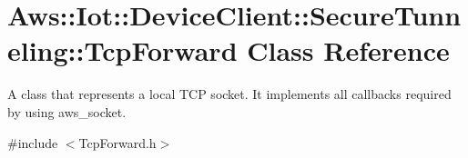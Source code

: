 \hypertarget{class_aws_1_1_iot_1_1_device_client_1_1_secure_tunneling_1_1_tcp_forward}{}\section{Aws\+:\+:Iot\+:\+:Device\+Client\+:\+:Secure\+Tunneling\+:\+:Tcp\+Forward Class Reference}
\label{class_aws_1_1_iot_1_1_device_client_1_1_secure_tunneling_1_1_tcp_forward}


A class that represents a local T\+CP socket. It implements all callbacks required by using aws\+\_\+socket.  




{\ttfamily \#include $<$Tcp\+Forward.\+h$>$}

